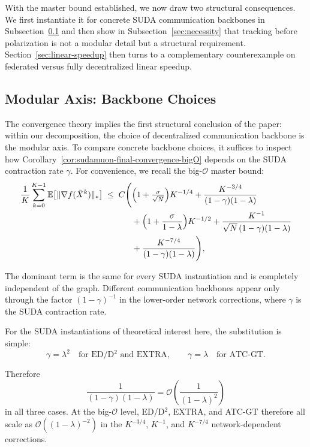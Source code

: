 \documentclass{article}
\begin{document}
With the master bound established, we now draw two structural consequences. We first instantiate it for concrete SUDA communication backbones in Subsection~\ref{sec:discussion} and then show in Subsection~\ref{sec:necessity} that tracking before polarization is not a modular detail but a structural requirement. Section~\ref{sec:linear-speedup} then turns to a complementary counterexample on federated versus fully decentralized linear speedup.


\subsection{Modular Axis: Backbone Choices}\label{sec:discussion}


The convergence theory implies the first structural conclusion of the paper:
within our decomposition, the choice of decentralized communication backbone is
the modular axis.
To compare concrete backbone choices, it suffices to inspect how
Corollary~\ref{cor:sudamuon-final-convergence-bigO} depends on the SUDA
contraction rate $\gamma$. For convenience, we recall the big-$\mathcal{O}$
master bound:
\begin{equation}
\label{eq:discussion-master}
\begin{split}
\frac{1}{K}\sum_{k=0}^{K-1} \mathbb{E}\big[\|\nabla f(\bar X^k)\|_*\big]
\;\le\; C\Bigg(&
\Bigl(1+\tfrac{\sigma}{\sqrt{N}}\Bigr)K^{-1/4}
+\frac{K^{-3/4}}{(1-\gamma)(1-\lambda)}
\\
&+\Bigl(1+\frac{\sigma}{1-\lambda}\Bigr)K^{-1/2}
+\frac{K^{-1}}{\sqrt{N}\,(1-\gamma)(1-\lambda)}
\\
&+\frac{K^{-7/4}}{(1-\gamma)(1-\lambda)}
\Bigg),
\end{split}
\end{equation}

The dominant term is the same for every SUDA instantiation and is completely
independent of the graph. Different communication backbones appear only through
the factor $(1-\gamma)^{-1}$ in the lower-order network corrections, where
$\gamma$ is the SUDA contraction rate.



For the SUDA instantiations of theoretical interest here, the substitution is simple:
\[
\gamma=\lambda^2 \quad \text{for ED/D$^2$ and EXTRA}, \qquad
\gamma=\lambda \quad \text{for ATC-GT}.
\]

Therefore
\[
\frac{1}{(1-\gamma)(1-\lambda)}
= \mathcal{O}\!\left(\frac{1}{(1-\lambda)^2}\right)
\]
in all three cases. At the big-$\mathcal{O}$ level, ED/D$^2$, EXTRA, and
ATC-GT therefore all scale as $\mathcal{O}((1-\lambda)^{-2})$ in the
$K^{-3/4}$, $K^{-1}$, and $K^{-7/4}$ network-dependent corrections.
\end{document}
